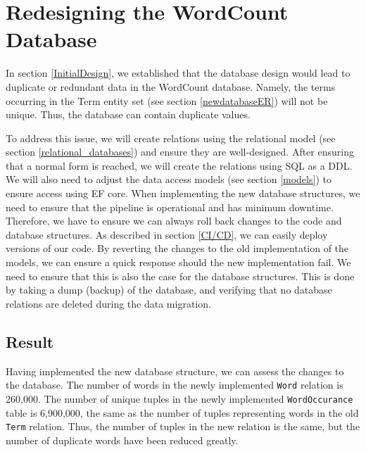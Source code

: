 \section{Redesigning the WordCount Database}
In section \ref{InitialDesign}, we established that the database design would lead to duplicate or redundant data in the WordCount database.
Namely, the terms occurring in the Term entity set (see section \ref{newdatabaseER}) will not be unique. 
Thus, the database can contain duplicate values.
 
To address this issue, we will create relations using the relational model (see section \ref{relational_databases}) and ensure they are well-designed.
After ensuring that a normal form is reached, we will create the relations using SQL as a DDL.
We will also need to adjust the data access models (see section \ref{models}) to ensure access using EF core.
When implementing the new database structures, we need to ensure that the pipeline is operational and has minimum downtime. 
Therefore, we have to ensure we can always roll back changes to the code and database structures.
As described in section \ref{CI/CD}, we can easily deploy versions of our code.
By reverting the changes to the old implementation of the models, we can ensure a quick response should the new implementation fail.
We need to ensure that this is also the case for the database structures.
This is done by taking a dump (backup) of the database, and verifying that no database relations are deleted during the data migration.




\subsection{Result}
Having implemented the new database structure, we can assess the changes to the database. 
The number of words in the newly implemented \texttt{Word} relation is 260,000.
The number of unique tuples in the newly implemented \texttt{WordOccurance} table is 6,900,000, the same as the number of tuples representing words in the old \texttt{Term} relation.
Thus, the number of tuples in the new relation is the same, but the number of duplicate words have been reduced greatly.
